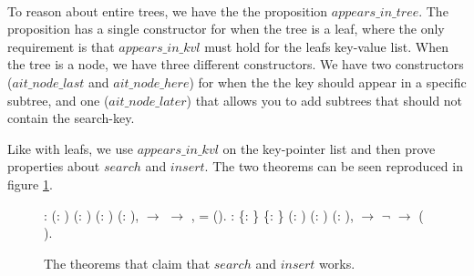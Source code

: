 \paragraph{}
To reason about entire trees, we have the the proposition $appears\_in\_tree$. The proposition has a single constructor for when the tree is a leaf, where the only requirement is that $appears\_in\_kvl$ must hold for the leafs key-value list. When the tree is a node, we have three different constructors. We have two constructors ($ait\_node\_last$ and $ait\_node\_here$) for when the the key should appear in a specific subtree, and one ($ait\_node\_later$) that allows you to add subtrees that should not contain the search-key.

Like with leafs, we use $appears\_in\_kvl$ on the key-pointer list and then prove properties about $search$ and $insert$. The two theorems can be seen reproduced in figure \ref{fig:search_and_insert_works}.


\begin{figure}
  \begin{coqdoccode}
  \coqdocnoindent
    : \coqdockw{\ensuremath{\forall}} (: ) (: ) (:   ) (: ),\coqdoceol
  \coqdocindent{1.00em}
      \ensuremath{\rightarrow} \coqdoceol
  \coqdocindent{1.00em}
     \ensuremath{\rightarrow} \coqdoceol
  \coqdocindent{1.00em}
  \coqdocvar{\ensuremath{\exists}} ,    = ().\coqdoceol
  \coqdocemptyline
  \coqdocnoindent
    : \coqdockw{\ensuremath{\forall}} \{: \} \{: \} (:   ) (: ) (: ),\coqdoceol
  \coqdocindent{1.00em}
      \ensuremath{\rightarrow} \coqdoceol
  \coqdocindent{1.00em}
  \ensuremath{\lnot}   \ensuremath{\rightarrow} \coqdoceol
  \coqdocindent{1.00em}
    (   ).\coqdoceol
  \coqdocemptyline
  \end{coqdoccode}
  \caption{The theorems that claim that $search$ and $insert$ works.}
  \label{fig:search_and_insert_works}
\end{figure}
